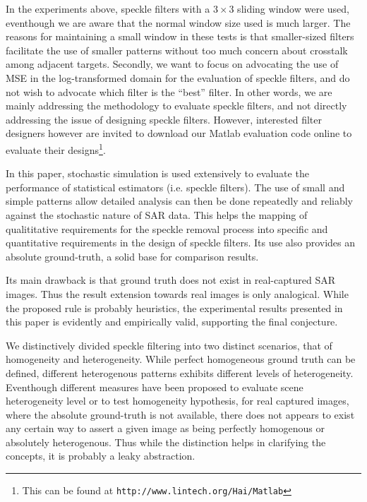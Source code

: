\documentclass[journal]{IEEEtran}
\begin{document}
In the experiments above, speckle filters with a $3 \times 3$ sliding window were used, 
	eventhough we are aware that the normal window size used is much larger. 
The reasons for maintaining a small window in these tests is that 
	smaller-sized filters facilitate the use of smaller patterns without too much concern about crosstalk among adjacent targets.
Secondly, we want to focus on advocating the use of MSE in the log-transformed domain for the evaluation of speckle filters, 
	and do not wish to advocate which filter is the ``best'' filter. 
In other words, we are mainly addressing the methodology to evaluate speckle filters, 
	and not directly addressing the issue of designing speckle filters.
However, interested filter designers however are invited to download our Matlab evaluation code online to evaluate their designs\footnote{This can be found at \texttt{http://www.lintech.org/Hai/Matlab}}.

In this paper, stochastic simulation is used extensively to evaluate the performance of statistical estimators (i.e. speckle filters).
The use of small and simple patterns allow detailed analysis can then be done repeatedly and reliably against the stochastic nature of SAR data.%
This helps the mapping of qualititative requirements for the speckle removal process into specific and quantitative requirements in the design of speckle filters.
Its use also provides an absolute ground-truth, a solid base for comparison results.

Its main drawback is that ground truth does not exist in real-captured SAR images.%
Thus the result extension towards real images is only analogical.
While the proposed rule is probably heuristics, 
	the experimental results presented in this paper is evidently and empirically valid,
	supporting the final conjecture.

We distinctively divided speckle filtering into two distinct scenarios, that of homogeneity and heterogeneity.
While perfect homogeneous ground truth can be defined, 
	different heterogenous patterns exhibits different levels of heterogeneity. 
Eventhough different measures have been proposed to evaluate scene heterogeneity level or to test homogeneity hypothesis, 
	for real captured images, where the absolute ground-truth is not available, 
	there does not appears to exist any certain way to assert a given image as being perfectly homogenous or absolutely heterogenous.
Thus while the distinction helps in clarifying the concepts, 
	it is probably a leaky abstraction.
\end{document}
